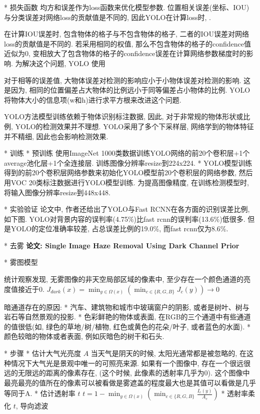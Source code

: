 				* 损失函数
					均方和误差作为loss函数来优化模型参数. 位置相关误差(坐标、IOU)与分类误差对网络loss的贡献值是不同的, 因此YOLO在计算loss时, .

					在计算IOU误差时, 包含物体的格子与不包含物体的格子, 二者的IOU误差对网络loss的贡献值是不同的. 若采用相同的权值, 那么不包含物体的格子的confidence值近似为0, 变相放大了包含物体的格子的confidence误差在计算网络参数梯度时的影响. 为解决这个问题, YOLO 使用

					对于相等的误差值, 大物体误差对检测的影响应小于小物体误差对检测的影响. 这是因为, 相同的位置偏差占大物体的比例远小于同等偏差占小物体的比例. YOLO将物体大小的信息项(w和h)进行求平方根来改进这个问题. 

					YOLO方法模型训练依赖于物体识别标注数据, 因此, 对于非常规的物体形状或比例, YOLO的检测效果并不理想. YOLO采用了多个下采样层, 网络学到的物体特征并不精细, 因此也会影响检测效果. 

			* 训练
				* 预训练
					使用ImageNet 1000类数据训练YOLO网络的前20个卷积层+1个average池化层+1个全连接层. 训练图像分辨率resize到224x224. 
				* YOLO模型训练
					得到的前20个卷积层网络参数来初始化YOLO模型前20个卷积层的网络参数, 然后用VOC 20类标注数据进行YOLO模型训练. 为提高图像精度, 在训练检测模型时, 将输入图像分辨率resize到448x448. 

			* 实验验证
				论文中, 作者还给出了YOLO与Fast RCNN在各方面的识别误差比例, 如下图. YOLO对背景内容的误判率(4.75\%)比fast rcnn的误判率(13.6\%)低很多. 但是YOLO的定位准确率较差, 占总误差比例的19.0\%, 而fast rcnn仅为8.6\%. 

	* 去雾
		\bf{论文}: Single Image Haze Removal Using Dark Channel Prior

		* 雾图模型

			统计观察发现, 无雾图像的非天空局部区域的像素中, 至少存在一个颜色通道的亮度值接近于0.
			$J_{dark}(x) = \min_{y\in \Omega(x)} (\min_{c\in \{R,G,B\}} J_c(y)) \to 0$

			暗通道存在的原因:
				* 汽车、建筑物和城市中玻璃窗户的阴影, 或者是树叶、树与岩石等自然景观的投影.
				* 色彩鲜艳的物体或表面, 在RGB的三个通道中有些通道的值很低(如, 绿色的草地/树/植物, 红色或黄色的花朵/叶子, 或者蓝色的水面).
				* 颜色较暗的物体或者表面, 例如灰暗色的树干和石头. 

		* 步骤
			* 估计大气光亮度 $A$
				当天气是阴天的时候, 太阳光通常都是被忽略的, 在这种情况下大气光是景观中唯一的可照亮来源. 如果有一个图像中, 存在一个很远很远的无限远的距离的像素存在, (这个时候, 此像素的透射率几乎为0). 这个图像中最亮最亮的值所在的像素可以被看做是雾遮盖的程度最大也是其值可以看做是几乎等同于A.
			* 估计透射率 $t$
				$t = 1 - \min_{y\in \Omega(x)} ( \min_{c\in \{R,G,B\}} \frac{I_c(y)}{A_c} )$
			* 透射率柔化 $t$, 导向滤波
			
